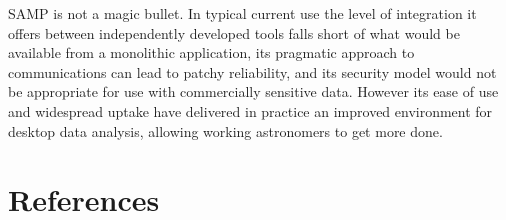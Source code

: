\documentclass[5p]{elsarticle}
\begin{document}
SAMP is not a magic bullet.
In typical current use the level of integration it offers
between independently developed tools falls short of what would be
available from a monolithic application,
its pragmatic approach to communications can lead to patchy reliability,
and its security model would not be appropriate for use with
commercially sensitive data.
However its ease of use and widespread uptake have delivered in practice
an improved environment for desktop data analysis,
allowing working astronomers to get more done.



\section*{References}


\end{document}
